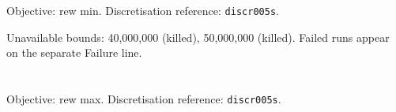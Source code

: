 \documentclass[a4paper,10pt]{article}
\begin{document}
\noindent\begin{minipage}{\linewidth}
\section*{\small\texttt{}}
Objective: rew min. Discretisation reference: \texttt{discr005s}.

\begin{minipage}[t]{0.48\linewidth}\centering

\end{minipage}
\hfill
\begin{minipage}[t]{0.48\linewidth}\centering

\end{minipage}
\par\medskip
Unavailable bounds: 40,000,000 (killed), 50,000,000 (killed). Failed runs appear on the separate Failure line.

\end{minipage}\par\bigskip
\noindent\begin{minipage}{\linewidth}
\section*{\small\texttt{}}
Objective: rew max. Discretisation reference: \texttt{discr005s}.

\begin{minipage}[t]{0.48\linewidth}\centering

\end{minipage}
\hfill
\begin{minipage}[t]{0.48\linewidth}\centering

\end{minipage}
\par\medskip
\end{minipage}\par\bigskip
\end{document}
